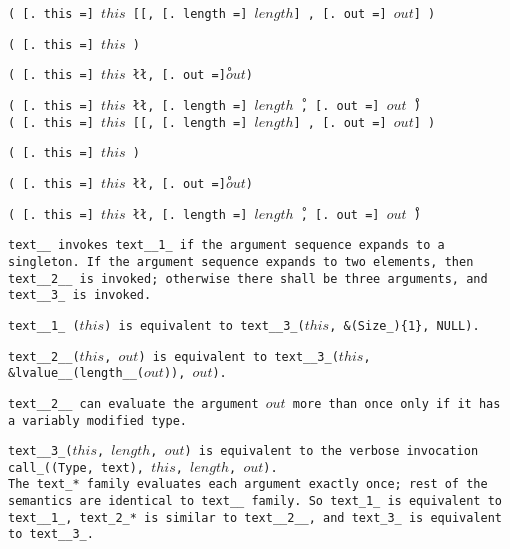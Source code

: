 
\s\s\s\s\tt{(} [\tt{. this =}] $this$ [[\tt{,}
[\tt{. length =}] $length$] \tt{,} [\tt{. out =}] $out$] \tt{)}

\s\s\tt{(} [\tt{. this =}] $this$ \tt{)}

\s\tt{(}  [\tt{. this =}] $this$
\l\l\tt{,} [\tt{. out =}]\r $out$\r \tt{)}

\s\s\tt{(} [\tt{. this =}] $this$ \l\l\tt{,}
[\tt{. length =}] $length$\r\ \tt{,} [\tt{. out =}] $out$\r\ \tt{)}\\

\s\s\s\s\s\tt{(} [\tt{. this =}] $this$ [[\tt{,}
[\tt{. length =}] $length$] \tt{,} [\tt{. out =}] $out$] \tt{)}

\s\s\s\tt{(} [\tt{. this =}] $this$ \tt{)}

\s\s\s\tt{(} [\tt{. this =}] $this$
\l\l\tt{,} [\tt{. out =}]\r $out$\r \tt{)}

\s\s\s\tt{(} [\tt{. this =}] $this$ \l\l\tt{,}
[\tt{. length =}] $length$\r\ \tt{,} [\tt{. out =}] $out$\r\ \tt{)}


\tt{text__} invokes \tt{text__1_} if the argument sequence expands to a singleton.
If the argument sequence expands to two elements, then \tt{text__2__} is invoked;
otherwise there shall be three arguments, and \tt{text__3_} is invoked.

\tt{text__1_ (}$this$\tt{)} is equivalent to
\tt{text__3_(}$this$\tt{, &(Size_)\{1\}, NULL)}.

\tt{text__2__(}$this$\tt{,} $out$\tt{)} is equivalent to
\tt{text__3_(}$this$\tt{, &lvalue__(length__(}$out$\tt{)),} $out$\tt{)}.

\tt{text__2__} can evaluate the argument $out$ more
than once only if it has a variably modified type.

\tt{text__3_(}$this$\tt{,} $length$\tt{,} $out$\tt{)} is equivalent to the verbose
invocation \tt{call_((Type, text),}  $this$\tt{,} $length$\tt{,} $out$\tt{)}.\\

The \tt{text_}* family evaluates each argument exactly once;
rest of the semantics are identical to \tt{text__} family.
So \tt{text_1_} is equivalent to \tt{text__1_}, \tt{text_2_}* is similar
to \tt{text__2__}, and \tt{text_3_} is equivalent to \tt{text__3_}.
